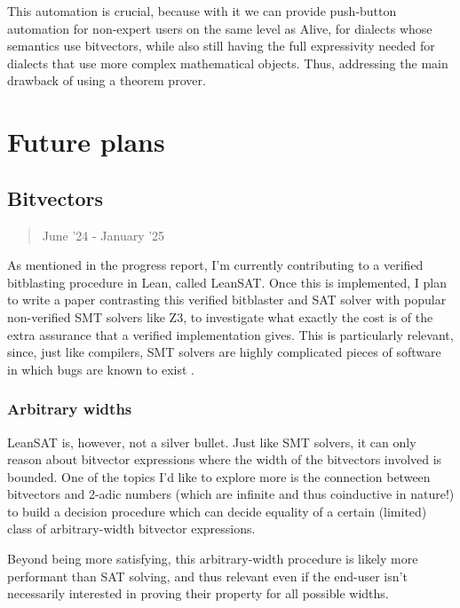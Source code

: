 \documentclass[a4paper]{scrartcl}
\begin{document}
This automation is crucial, because with it we can provide push-button
automation for non-expert users on the same level as Alive, for dialects
whose semantics use bitvectors, while also still having the full
expressivity needed for dialects that use more complex mathematical
objects. Thus, addressing the main drawback of using a theorem prover.


\section{Future plans}\label{future-plans}


\subsection{Bitvectors}\label{bitvectors-1}

\begin{quote}
June '24 - January '25
\end{quote}

As mentioned in the progress report, I'm currently contributing to a
verified bitblasting procedure in Lean, called LeanSAT. Once this is
implemented, I plan to write a paper contrasting this verified
bitblaster and SAT solver with popular non-verified SMT solvers like Z3,
to investigate what exactly the cost is of the extra assurance that a
verified implementation gives. This is particularly relevant, since,
just like compilers, SMT solvers are highly complicated pieces of
software in which bugs are known to exist
\cite{brummayerFuzzingDeltadebuggingSMT2009}.


\subsubsection{Arbitrary widths}\label{arbitrary-widths}

LeanSAT is, however, not a silver bullet. Just like SMT solvers, it can
only reason about bitvector expressions where the width of the
bitvectors involved is bounded. One of the topics I'd like to explore
more is the connection between bitvectors and 2-adic numbers (which are
infinite and thus coinductive in nature!) to build a decision procedure
which can decide equality of a certain (limited) class of
arbitrary-width bitvector expressions.

Beyond being more satisfying, this arbitrary-width procedure is likely
more performant than SAT solving, and thus relevant even if the end-user
isn't necessarily interested in proving their property for all possible
widths.
\end{document}

